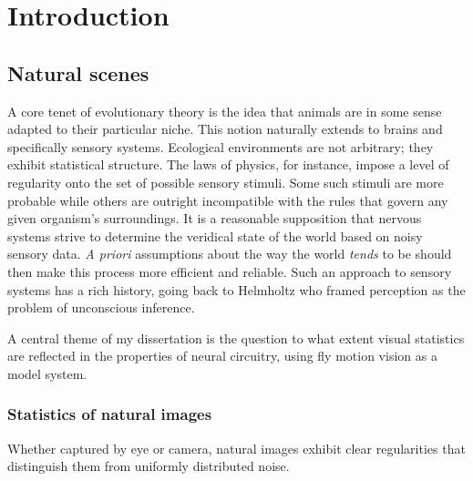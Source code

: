 \chapter{Introduction}
\label{chp:introduction}



\section{Natural scenes}

A core tenet of evolutionary theory is the idea that animals are in some sense adapted to their particular niche. This notion naturally extends to brains and specifically sensory systems. Ecological environments are not arbitrary; they exhibit statistical structure. The laws of physics, for instance, impose a level of regularity onto the set of possible sensory stimuli. Some such stimuli are more probable while others are outright incompatible with the rules that govern any given organism's surroundings. It is a reasonable supposition that nervous systems strive to determine the veridical state of the world based on noisy sensory data. \textit{A priori} assumptions about the way the world \textit{tends} to be should then make this process more efficient and reliable. Such an approach to sensory systems has a rich history, going back to Helmholtz who framed perception as the problem of unconscious inference.

A central theme of my dissertation is the question to what extent visual statistics are reflected in the properties of neural circuitry, using fly motion vision as a model system.

\subsection{Statistics of natural images} Whether captured by eye or camera, natural images exhibit clear regularities that distinguish them from uniformly distributed noise.

